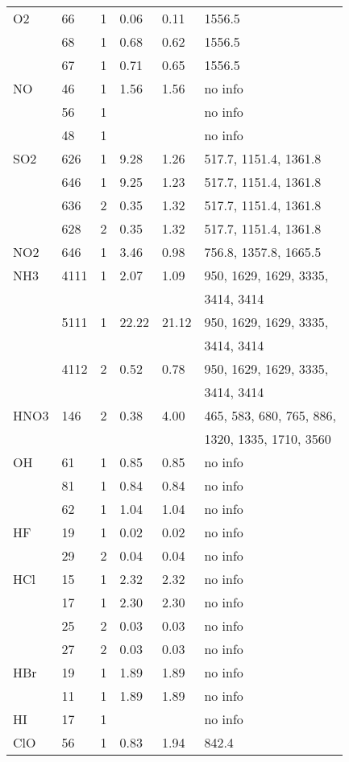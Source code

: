 \begin{longtable}{llllll}
\hline
  O2& 66& 1& 0.06& 0.11& 1556.5\\
    & 68& 1& 0.68& 0.62& 1556.5\\
    & 67& 1& 0.71& 0.65& 1556.5\\
\hline
  NO& 46& 1& 1.56& 1.56& no info\\
    & 56& 1& & & no info\\
    & 48& 1& & & no info\\
\hline
  SO2& 626& 1& 9.28& 1.26& 517.7, 1151.4, 1361.8\\
     & 646& 1& 9.25& 1.23& 517.7, 1151.4, 1361.8\\
     & 636& 2& 0.35& 1.32& 517.7, 1151.4, 1361.8\\
     & 628& 2& 0.35& 1.32& 517.7, 1151.4, 1361.8\\
\hline
  NO2& 646& 1& 3.46& 0.98& 756.8, 1357.8, 1665.5\\
\hline
  NH3& 4111& 1& 2.07& 1.09& 950, 1629, 1629, 3335,\\
     &     &  &     &     & 3414, 3414\\
     & 5111& 1& 22.22& 21.12& 950, 1629, 1629, 3335,\\
     &     &  &      &      & 3414, 3414\\
     & 4112& 2& 0.52& 0.78& 950, 1629, 1629, 3335,\\
     &     &  &     &     & 3414, 3414\\ 
\hline
  HNO3& 146& 2& 0.38& 4.00& 465, 583, 680, 765, 886,\\
      &    &  &     &     & 1320, 1335, 1710, 3560\\
\hline
  OH& 61& 1& 0.85& 0.85& no info\\
    & 81& 1& 0.84& 0.84& no info\\
    & 62& 1& 1.04& 1.04& no info\\
\hline
  HF& 19& 1& 0.02& 0.02& no info\\
    & 29& 2& 0.04& 0.04& no info\\
\hline
  HCl& 15& 1& 2.32& 2.32& no info\\
     & 17& 1& 2.30& 2.30& no info\\
     & 25& 2& 0.03& 0.03& no info\\
     & 27& 2& 0.03& 0.03& no info\\
\hline
  HBr& 19& 1& 1.89& 1.89& no info\\
     & 11& 1& 1.89& 1.89& no info\\
\hline
  HI& 17& 1& & & no info\\
\hline
  ClO& 56& 1& 0.83& 1.94& 842.4\\

\end{longtable}

